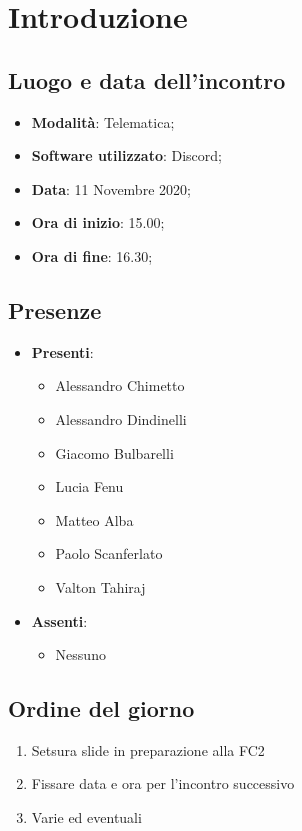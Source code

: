 \documentclass[]{article}
\begin{document}
	
	
	
	\newpage
	
	
	\section{Introduzione}
	\subsection{Luogo e data dell'incontro}
	\begin{itemize}
		\item \textbf{Modalità}: Telematica;
		\item \textbf{Software utilizzato}: Discord;
		\item \textbf{Data}: 11 Novembre 2020;
		\item \textbf{Ora di inizio}: 15.00;
		\item \textbf{Ora di fine}: 16.30;
	\end{itemize}
	
	\subsection{Presenze}
	\begin{itemize}
		\item \textbf{Presenti}: 
		\begin{itemize}
			\item Alessandro Chimetto
			\item Alessandro Dindinelli
			\item Giacomo Bulbarelli
			\item Lucia Fenu
			\item Matteo Alba
			\item Paolo Scanferlato
			\item Valton Tahiraj
		\end{itemize}
		\item \textbf{Assenti}:
		\begin{itemize}
			\item Nessuno
		\end{itemize}
	\end{itemize}
	
	\subsection{Ordine del giorno}
	\begin{enumerate}
		\item Setsura slide in preparazione alla FC2 
		\item Fissare data e ora per l'incontro successivo
		\item Varie ed eventuali
	\end{enumerate}
	
\end{document}
